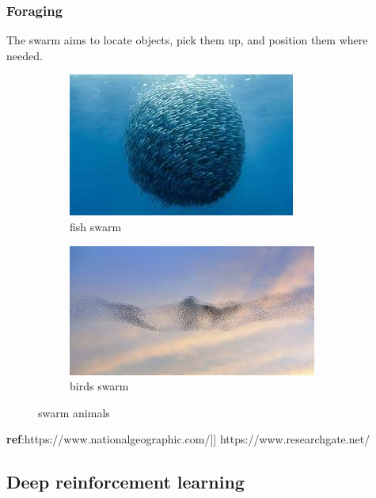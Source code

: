 \documentclass[12pt]{extarticle}
\begin{document}
\subsubsection{Foraging}
The swarm aims to locate objects, pick them up, and position them where needed.





\begin{figure}
\centering
\begin{subfigure}{.5\textwidth}
  \centering
  \includegraphics[width=.8\linewidth]{swarmfish}
  \caption{fish swarm}
  \label{fig:sub1}
\end{subfigure}%
\begin{subfigure}{.5\textwidth}
  \centering
  \includegraphics[width=.8\linewidth]{swarmbirds }
  \caption{birds swarm  }
  \label{fig:sub2}
\end{subfigure}
\caption{swarm animals}
\label{fig:test}
\end{figure}
\textbf{ref}:https://www.nationalgeographic.com/]]
https://www.researchgate.net/




\newpage
\pagebreak
\hspace{0pt}
\vfill
\begin{center}
\section{Deep reinforcement learning}
\end{center}
\vfill
\hspace{0pt}
\end{document}
